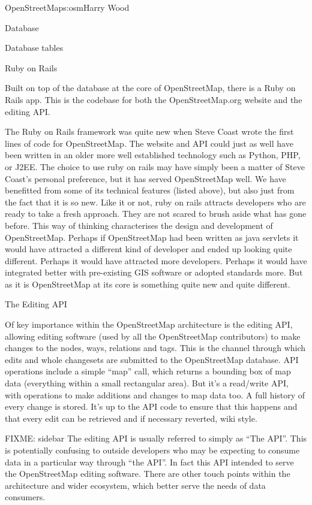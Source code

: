 \begin{aosachapter}{OpenStreetMap}{s:osm}{Harry Wood}
\begin{aosasect1}{Database}
\begin{aosasect2}{Database tables}
\end{aosasect2}

\end{aosasect1}

\begin{aosasect1}{Ruby on Rails}

Built on top of the database at the core of OpenStreetMap, there is a
Ruby on Rails app. This is the codebase for both the OpenStreetMap.org
website and the editing API.

The Ruby on Rails framework was quite new when Steve Coast wrote the
first lines of code for OpenStreetMap. The website and API could just
as well have been written in an older more well established technology
such as Python, PHP, or J2EE. The choice to use ruby on rails may have
simply been a matter of Steve Coast's personal preference, but it has
served OpenStreetMap well. We have benefitted from some of its
technical features (listed above), but also just from the fact that it
is so new. Like it or not, ruby on rails attracts developers who are
ready to take a fresh approach. They are not scared to brush aside
what has gone before. This way of thinking characterises the design
and development of OpenStreetMap. Perhaps if OpenStreetMap had been
written as java servlets it would have attracted a different kind of
developer and ended up looking quite different. Perhaps it would have
attracted more developers. Perhaps it would have integrated better
with pre-existing GIS software or adopted standards more. But as it is
OpenStreetMap at its core is something quite new and quite different.

\begin{aosasect2}{The Editing API}

Of key importance within the OpenStreetMap architecture is the editing
API, allowing editing software (used by all the OpenStreetMap
contributors) to make changes to the nodes, ways, relations and
tags. This is the channel through which edits and whole changesets are
submitted to the OpenStreetMap database. API operations include a
simple ``map'' call, which returns a bounding box of map data
(everything within a small rectangular area). But it's a read/write
API, with operations to make additions and changes to map data too. A
full history of every change is stored. It's up to the API code to
ensure that this happens and that every edit can be retrieved and if
necessary reverted, wiki style.

FIXME: sidebar The editing API is usually referred to simply as ``The
API''. This is potentially confusing to outside developers who may be
expecting to consume data in a particular way through ``the API''. In
fact this API intended to serve the OpenStreetMap editing
software. There are other touch points within the architecture and
wider ecosystem, which better serve the needs of data consumers.


\end{aosasect2}
\end{aosasect1}
\end{aosachapter}
